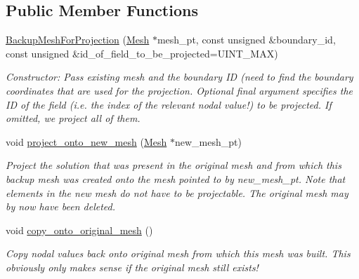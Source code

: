\subsection*{Public Member Functions}
\begin{DoxyCompactItemize}
\item 
\hyperlink{classoomph_1_1BackupMeshForProjection_a15032c7709e65ad4e1d00a6406786c6c}{Backup\+Mesh\+For\+Projection} (\hyperlink{classoomph_1_1Mesh}{Mesh} $\ast$mesh\+\_\+pt, const unsigned \&boundary\+\_\+id, const unsigned \&id\+\_\+of\+\_\+field\+\_\+to\+\_\+be\+\_\+projected=U\+I\+N\+T\+\_\+\+M\+AX)
\begin{DoxyCompactList}\small\item\em Constructor\+: Pass existing mesh and the boundary ID (need to find the boundary coordinates that are used for the projection. Optional final argument specifies the ID of the field (i.\+e. the index of the relevant nodal value!) to be projected. If omitted, we project all of them. \end{DoxyCompactList}\item 
void \hyperlink{classoomph_1_1BackupMeshForProjection_ab96a32a5934ef0edfbc50eb846cb3641}{project\+\_\+onto\+\_\+new\+\_\+mesh} (\hyperlink{classoomph_1_1Mesh}{Mesh} $\ast$new\+\_\+mesh\+\_\+pt)
\begin{DoxyCompactList}\small\item\em Project the solution that was present in the original mesh and from which this backup mesh was created onto the mesh pointed to by new\+\_\+mesh\+\_\+pt. Note that elements in the new mesh do not have to be projectable. The original mesh may by now have been deleted. \end{DoxyCompactList}\item 
void \hyperlink{classoomph_1_1BackupMeshForProjection_a228c554024e2651071bc0e1282641e1f}{copy\+\_\+onto\+\_\+original\+\_\+mesh} ()
\begin{DoxyCompactList}\small\item\em Copy nodal values back onto original mesh from which this mesh was built. This obviously only makes sense if the original mesh still exists! \end{DoxyCompactList}\end{DoxyCompactItemize}
